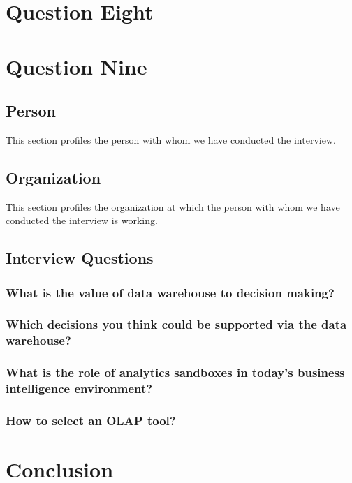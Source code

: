 \documentclass[12p,a4paper]{report}
\begin{document}
\chapter{Question Eight}


\chapter{Question Nine}


\section{Person}
This section profiles the person with whom we have conducted the interview. 

\section{Organization}
This section profiles the organization at which the person with whom we have conducted the interview is working. 

\section{Interview Questions}

\subsection{What is the value of data warehouse to decision making?}
    
\subsection{Which decisions you think could be supported via the data warehouse?}

\subsection{What is the role of analytics sandboxes in today’s business intelligence environment?} 

\subsection{How to select an OLAP tool?}

\chapter{Conclusion}


\printbibliography
\end{document}
